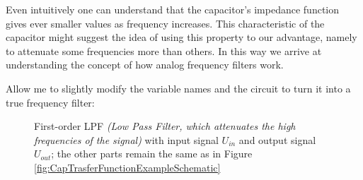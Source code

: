\documentclass[a4paper, 10pt, final]{article} %
\begin{document}
    Even intuitively one can understand that the capacitor's impedance function gives ever smaller values as frequency increases.
    This characteristic of the capacitor might suggest the idea of using this property to our advantage, namely to attenuate some frequencies more than others.
    In this way we arrive at understanding the concept of how analog frequency filters work.

    Allow me to slightly modify the variable names and the circuit to turn it into a true frequency filter:
    \begin{figure}[H]
        \centering
        \caption{First-order LPF \emph{(Low Pass Filter, which attenuates the high frequencies of the signal)} with input signal $U_{in}$ and output signal $U_{out}$; the other parts remain the same as in Figure \ref{fig:CapTrasferFunctionExampleSchematic}}
        \label{fig:CapFilterExample}
    \end{figure}
\end{document}
